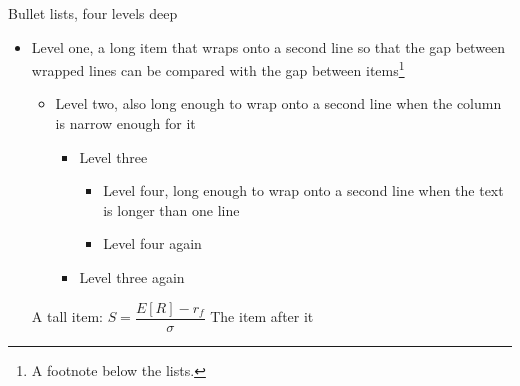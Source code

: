 \begin{standardframe}{Bullet lists, four levels deep}
	\begin{itemize}
		\item Level one, a long item that wraps onto a second line so that the gap between wrapped lines can be compared with the gap between items\footnote{A footnote below the lists.}
		\begin{itemize}
			\item Level two, also long enough to wrap onto a second line when the column is narrow enough for it
			\begin{itemize}
				\item Level three
				\begin{itemize}
					\item Level four, long enough to wrap onto a second line when the text is longer than one line
					\item Level four again
				\end{itemize}
				\item Level three again
			\end{itemize}
		\end{itemize}
		\tallitem A tall item: $S=\dfrac{E[R]-r_f}{\sigma}$
		\tallitem The item after it
	\end{itemize}
\end{standardframe}
